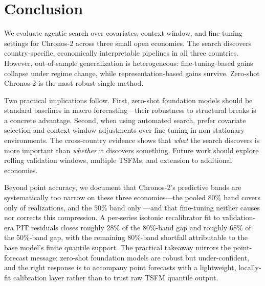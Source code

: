 \documentclass[12pt,a4paper]{article}
\begin{document}
\section{Conclusion}
\label{sec:conclusion}

We evaluate agentic search over covariates, context window, and fine-tuning settings for Chronos-2 across three small open economies. The search discovers country-specific, economically interpretable pipelines in all three countries. However, out-of-sample generalization is heterogeneous: fine-tuning-based gains collapse under regime change, while representation-based gains survive. Zero-shot Chronos-2 is the most robust single method.

Two practical implications follow. First, zero-shot foundation models should be standard baselines in macro forecasting---their robustness to structural breaks is a concrete advantage. Second, when using automated search, prefer covariate selection and context window adjustments over fine-tuning in non-stationary environments. The cross-country evidence shows that \emph{what} the search discovers is more important than \emph{whether} it discovers something. Future work should explore rolling validation windows, multiple TSFMs, and extension to additional economies.

Beyond point accuracy, we document that Chronos-2's predictive bands are systematically too narrow on these three economies---the pooled $80\%$ band covers only \pooledFTeighty{} of realizations, and the $50\%$ band only \pooledFTfifty{}---and that fine-tuning neither causes nor corrects this compression. A per-series isotonic recalibrator fit to validation-era PIT residuals closes roughly $28\%$ of the $80\%$-band gap and roughly $68\%$ of the $50\%$-band gap, with the remaining $80\%$-band shortfall attributable to the base model's finite quantile support. The practical takeaway mirrors the point-forecast message: zero-shot foundation models are robust but under-confident, and the right response is to accompany point forecasts with a lightweight, locally-fit calibration layer rather than to trust raw TSFM quantile output.


\newpage


\end{document}

